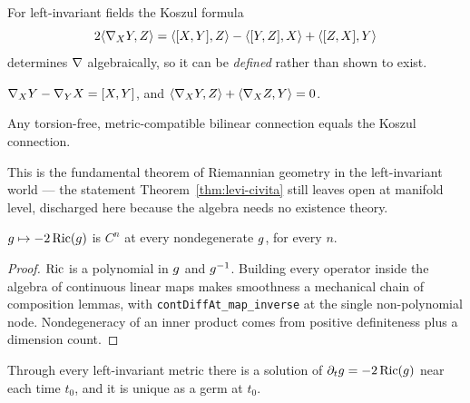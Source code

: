 \begin{definition}
  \label{def:koszul-li}
  \leanok
  For left-invariant fields the Koszul formula
  \[ 2\langle \nabla_X Y, Z\rangle = \langle [X,Y],Z\rangle - \langle [Y,Z],X\rangle
       + \langle [Z,X],Y\rangle \]
  determines $\nabla$ algebraically, so it can be \emph{defined} rather than shown
  to exist.
\end{definition}

\begin{lemma}
  \label{lem:koszul-li-props}
  \leanok
  $\nabla_X Y - \nabla_Y X = [X,Y]$, and
  $\langle \nabla_X Y, Z\rangle + \langle \nabla_X Z, Y\rangle = 0$.
\end{lemma}

\begin{theorem}
  \label{thm:levi-civita-li}
  \leanok
  Any torsion-free, metric-compatible bilinear connection equals the Koszul
  connection.

  This is the fundamental theorem of Riemannian geometry in the left-invariant
  world --- the statement Theorem~\ref{thm:levi-civita} still leaves open at
  manifold level, discharged here because the algebra needs no existence
  theory.
\end{theorem}

\begin{lemma}
  \label{lem:ricci-lie-ode}
  \leanok
  $g \mapsto -2\operatorname{Ric}(g)$ is $C^n$ at every nondegenerate $g$, for every $n$.
\end{lemma}

\begin{proof}
  \leanok
  $\operatorname{Ric}$ is a polynomial in $g$ and $g^{-1}$. Building every operator inside
  the algebra of continuous linear maps makes smoothness a mechanical chain of
  composition lemmas, with \texttt{contDiffAt\_map\_inverse} at the single
  non-polynomial node. Nondegeneracy of an inner product comes from positive
  definiteness plus a dimension count.
\end{proof}

\begin{theorem}
  \label{thm:ricci-lie-shortTime}
  \leanok
  Through every left-invariant metric there is a solution of
  $\partial_t g = -2\operatorname{Ric}(g)$ near each time $t_0$, and it is unique as a germ
  at $t_0$.
\end{theorem}


